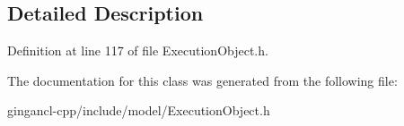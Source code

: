 \subsection{Detailed Description}




Definition at line 117 of file ExecutionObject.h.

The documentation for this class was generated from the following file:\begin{CompactItemize}
\item 
gingancl-cpp/include/model/ExecutionObject.h\end{CompactItemize}
